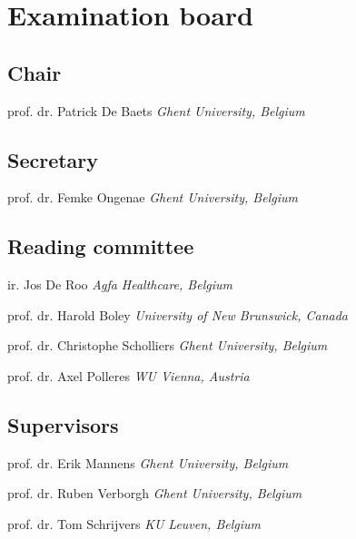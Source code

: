 \chapter*{Examination board}

\section*{Chair}
prof. dr. Patrick De Baets {\smaller \emph{Ghent University, Belgium}}

\section*{Secretary}

prof. dr. Femke Ongenae {\smaller \emph{Ghent University, Belgium}}

\section*{Reading committee}

ir. Jos De Roo {\smaller \emph{Agfa Healthcare, Belgium}}

prof. dr. Harold Boley {\smaller \emph{University of New Brunswick, Canada}}

prof. dr. Christophe Scholliers {\smaller \emph{Ghent University, Belgium}}

prof. dr. Axel Polleres  {\smaller \emph{WU Vienna, Austria}}

\section*{Supervisors}
prof. dr. Erik Mannens {\smaller \emph{Ghent University, Belgium}}

prof. dr. Ruben Verborgh {\smaller \emph{Ghent University, Belgium}}

prof. dr. Tom Schrijvers {\smaller \emph{KU Leuven, Belgium}}
